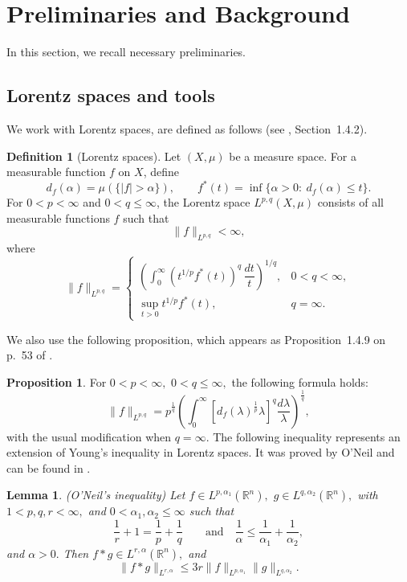 \documentclass[12pt]{article}
\newtheorem{lemma}[theorem]{Lemma}
\theoremstyle{definition}
\newtheorem{definition}[theorem]{Definition}
\newtheorem{proposition}[theorem]{Proposition}
\theoremstyle{remark}
\numberwithin{equation}{section}
\begin{document}
\section{Preliminaries and Background}
In this section, we recall necessary preliminaries.


\subsection{Lorentz spaces and tools}
We work with Lorentz spaces, are defined as follows (see \cite{Gra}, Section~1.4.2).
\begin{definition}[Lorentz spaces]
Let $(X,\mu)$ be a measure space. For a measurable function $f$ on $X$, define
\[
d_f(\alpha)=\mu(\{|f|>\alpha\}), \qquad
f^*(t)=\inf\{\alpha>0:\ d_f(\alpha)\le t\}.
\]
For $0<p<\infty$ and $0<q\le\infty$, the Lorentz space $L^{p,q}(X,\mu)$ consists of
all measurable functions $f$ such that
\[
\|f\|_{L^{p,q}}<\infty,
\]
where
\[
\|f\|_{L^{p,q}}
=
\begin{cases}
\left(\displaystyle\int_0^\infty
(t^{1/p}f^*(t))^q\,\dfrac{dt}{t}\right)^{1/q}, & 0<q<\infty,\\[1em]
\displaystyle\sup_{t>0} t^{1/p}f^*(t), & q=\infty.
\end{cases}
\]
\end{definition}


We also use the following proposition, which appears as Proposition~1.4.9 on p.~53 of \cite{Gra}. 
\begin{proposition} 
    For $0<p<\infty,$ $0<q\leq \infty,$ the following formula holds:
  \begin{equation}\label{eq:distr-def-lorentz}
    \|f\|_{L^{p,q}}=p^{\frac{1}{q}}\left(\int_{0}^{\infty}[d_f(\lambda)^{\frac{1}{p}}\lambda]^q\frac{d\lambda}{\lambda}\right)^{\frac{1}{q}},
  \end{equation}
with the usual modification when $q=\infty$.
The following inequality represents an extension of Young's inequality in Lorentz spaces. It was proved by O'Neil and can be found in \cite{ONe}.
\end{proposition}





\begin{lemma}(O'Neil's inequality)
    Let $f\in L^{p,\alpha_1}(\mathbb{R}^n),$ $g\in L^{q,\alpha_2}(\mathbb{R}^n),$ with $1<p,q,r<\infty,$ and $0<\alpha_1,\alpha_2\leq \infty$ such that \[\frac{1}{r}+1=\frac{1}{p}+\frac{1}{q} \qquad \text{and} \quad \frac{1}{\alpha}\leq \frac{1}{\alpha_1}+\frac{1}{\alpha_2},\]
   and $\alpha>0.$
   Then $f*g\in L^{r,\alpha}(\mathbb{R}^n),$ and 
   \[
   \|f*g\|_{L^{r,\alpha}} \leq 3r \|f\|_{L^{p,\alpha_1}}\|g\|_{L^{q,\alpha_2}}.
   \]
\end{lemma}
\end{document}

